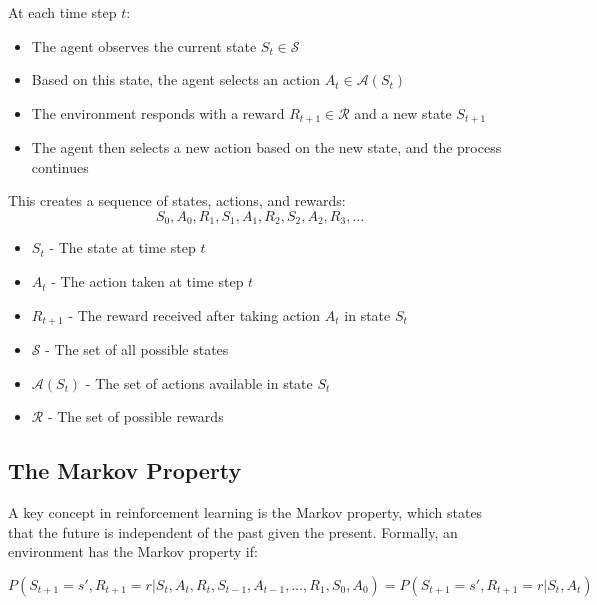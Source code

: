 \documentclass[12pt,a4paper]{article}
\begin{document}
At each time step $t$:
\begin{itemize}
    \item The agent observes the current state $S_t \in \mathcal{S}$
    \item Based on this state, the agent selects an action $A_t \in \mathcal{A}(S_t)$
    \item The environment responds with a reward $R_{t+1} \in \mathcal{R}$ and a new state $S_{t+1}$
    \item The agent then selects a new action based on the new state, and the process continues
\end{itemize}

This creates a sequence of states, actions, and rewards:
\begin{equation}
S_0, A_0, R_1, S_1, A_1, R_2, S_2, A_2, R_3, \ldots
\end{equation}

\begin{tcolorbox}[title=Notation Overview]
\begin{itemize}
    \item $S_t$ - The state at time step $t$
    \item $A_t$ - The action taken at time step $t$
    \item $R_{t+1}$ - The reward received after taking action $A_t$ in state $S_t$
    \item $\mathcal{S}$ - The set of all possible states
    \item $\mathcal{A}(S_t)$ - The set of actions available in state $S_t$
    \item $\mathcal{R}$ - The set of possible rewards
\end{itemize}
\end{tcolorbox}

\subsection{The Markov Property}

A key concept in reinforcement learning is the Markov property, which states that the future is independent of the past given the present. Formally, an environment has the Markov property if:

\begin{equation}
P(S_{t+1}=s', R_{t+1}=r | S_t, A_t, R_t, S_{t-1}, A_{t-1}, \ldots, R_1, S_0, A_0) = P(S_{t+1}=s', R_{t+1}=r | S_t, A_t)
\end{equation}
\end{document}
